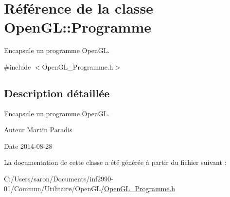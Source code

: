 \hypertarget{class_open_g_l_1_1_programme}{\section{Référence de la classe Open\-G\-L\-:\-:Programme}
\label{class_open_g_l_1_1_programme}
}


Encapsule un programme Open\-G\-L.  




{\ttfamily \#include $<$Open\-G\-L\-\_\-\-Programme.\-h$>$}



\subsection{Description détaillée}
Encapsule un programme Open\-G\-L. 

\begin{DoxyAuthor}{Auteur}
Martin Paradis 
\end{DoxyAuthor}
\begin{DoxyDate}{Date}
2014-\/08-\/28 
\end{DoxyDate}


La documentation de cette classe a été générée à partir du fichier suivant \-:\begin{DoxyCompactItemize}
\item 
C\-:/\-Users/saron/\-Documents/inf2990-\/01/\-Commun/\-Utilitaire/\-Open\-G\-L/\hyperlink{_open_g_l___programme_8h}{Open\-G\-L\-\_\-\-Programme.\-h}\end{DoxyCompactItemize}
